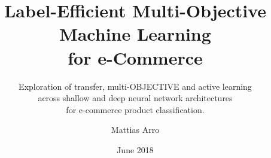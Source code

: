 \documentclass[a4paper,11pt]{kth-mag}
\title{
      Label-Efficient Multi-Objective Machine Learning
      \\for e-Commerce
    }
\subtitle{
      Exploration of transfer, multi-OBJECTIVE and active learning
      \\ across shallow and deep neural network architectures
      \\ for e-commerce product classification.
    }
\author{Mattias Arro}
\date{June 2018}
\begin{document}
\frontmatter


\removepagenumbers
\maketitle
{}

\begin{abstract}

\end{abstract}
\clearpage

% 

% 

\tableofcontents*

\mainmatter

\listoffigures

\newpage



\pagestyle{newchap}






\renewcommand\bibname{References}





% 
\end{document}
